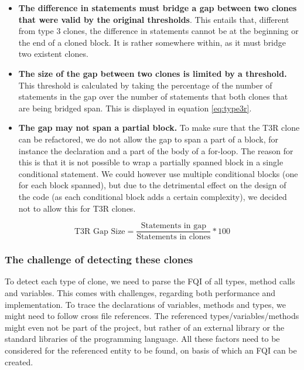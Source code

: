 \documentclass[a4paper]{article}
\begin{document}
\begin{itemize}
  \item \textbf{The difference in statements must bridge a gap between two clones that were valid by the original thresholds}. This entails that, different from type 3 clones, the difference in statements cannot be at the beginning or the end of a cloned block. It is rather somewhere within, as it must bridge two existent clones.
  \item \textbf{The size of the gap between two clones is limited by a threshold.} This threshold is calculated by taking the percentage of the number of statements in the gap over the number of statements that both clones that are being bridged span. This is displayed in equation \ref{eq:type3r}.
  \item \textbf{The gap may not span a partial block.} To make sure that the T3R clone can be refactored, we do not allow the gap to span a part of a block, for instance the declaration and a part of the body of a for-loop. The reason for this is that it is not possible to wrap a partially spanned block in a single conditional statement. We could however use multiple conditional blocks (one for each block spanned), but due to the detrimental effect on the design of the code (as each conditional block adds a certain complexity), we decided not to allow this for T3R clones.
\end{itemize}

\begin{equation}\label{eq:type3r}
\text{T3R Gap Size}=\frac{\text{Statements in gap}}{\text{Statements in clones}}*100
\end{equation}

\subsubsection{The challenge of detecting these clones}\label{chap:challenge}
To detect each type of clone, we need to parse the FQI of all types, method calls and variables. This comes with challenges, regarding both performance and implementation. To trace the declarations of variables, methods and types, we might need to follow cross file references. The referenced types/variables/methods might even not be part of the project, but rather of an external library or the standard libraries of the programming language. All these factors need to be considered for the referenced entity to be found, on basis of which an FQI can be created.
\end{document}
